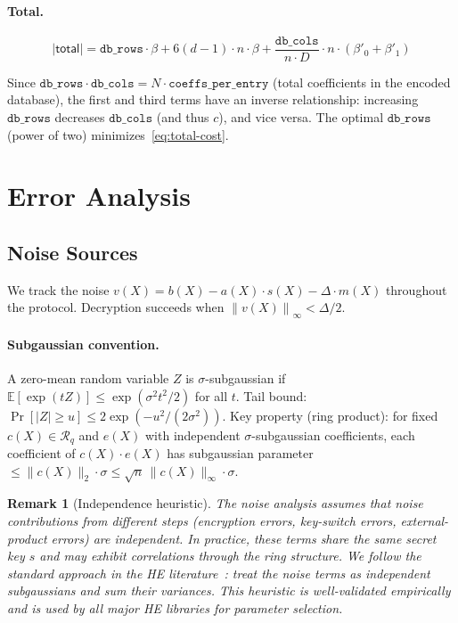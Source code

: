 \documentclass[11pt,a4paper]{article}
\newcommand{\R}{\mathcal{R}}
\newcommand{\Rq}{\R_{q}}
\newcommand{\norm}[1]{\left\lVert #1 \right\rVert_{\infty}}
\newtheorem{remark}{Remark}
\begin{document}
\paragraph{Total.}
\begin{equation}
    |\mathsf{total}| = \texttt{db\_rows} \cdot \beta + 6(d\!-\!1) \cdot n \cdot \beta + \frac{\texttt{db\_cols}}{n \cdot D} \cdot n \cdot (\beta'_0 + \beta'_1)
    \label{eq:total-cost}
\end{equation}

Since $\texttt{db\_rows} \cdot \texttt{db\_cols} = N \cdot \texttt{coeffs\_per\_entry}$ (total coefficients in the encoded database), the first and third terms have an inverse relationship: increasing $\texttt{db\_rows}$ decreases $\texttt{db\_cols}$ (and thus $c$), and vice versa.
The optimal $\texttt{db\_rows}$ (power of two) minimizes~\eqref{eq:total-cost}.

\section{Error Analysis}\label{sec:noise}

\subsection{Noise Sources}

We track the noise $v(X) = b(X) - a(X) \cdot s(X) - \Delta \cdot m(X)$ throughout the protocol.
Decryption succeeds when $\norm{v(X)} < \Delta/2$.

\paragraph{Subgaussian convention.}
A zero-mean random variable $Z$ is $\sigma$-subgaussian if $\mathbb{E}[\exp(tZ)] \le \exp(\sigma^2 t^2/2)$ for all $t$.
Tail bound: $\Pr[|Z| \ge u] \le 2\exp(-u^2/(2\sigma^2))$.
Key property (ring product): for fixed $c(X) \in \Rq$ and $e(X)$ with independent $\sigma$-subgaussian coefficients, each coefficient of $c(X) \cdot e(X)$ has subgaussian parameter $\le \|c(X)\|_2 \cdot \sigma \le \sqrt{n}\, \|c(X)\|_\infty \cdot \sigma$.

\begin{remark}[Independence heuristic]\label{rem:independence}
The noise analysis assumes that noise contributions from different steps (encryption errors, key-switch errors, external-product errors) are \emph{independent}.
In practice, these terms share the same secret key $s$ and may exhibit correlations through the ring structure.
We follow the standard approach in the HE literature~\cite{bfv,seal}: treat the noise terms as independent subgaussians and sum their variances.
This heuristic is well-validated empirically and is used by all major HE libraries for parameter selection.
\end{remark}
\end{document}
